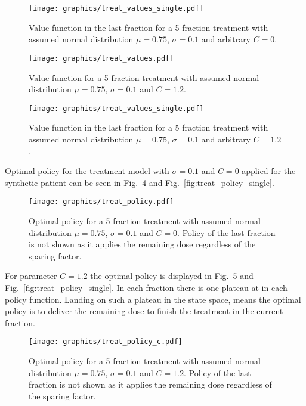 \documentclass[\relativeRoot/ada.tex]{subfiles}
\begin{document}
\begin{figure}[!htb]
    \centering
    \texttt{[image: graphics/treat\_values\_single.pdf]}
    \caption{Value function in the last fraction for a 5 fraction treatment with assumed normal distribution $\mu=0.75$, $\sigma=0.1$ and arbitrary $C=0$.}
    \label{fig:treat_values_single}
\end{figure}

\begin{figure}[!htb]
    \centering
    \texttt{[image: graphics/treat\_values.pdf]}
    \caption{Value function for a 5 fraction treatment with assumed normal distribution $\mu=0.75$, $\sigma=0.1$ and $C=1.2$.}
    \label{fig:treat_values_c}
\end{figure}

\begin{figure}[!htb]
    \centering
    \texttt{[image: graphics/treat\_values\_single.pdf]}
    \caption{Value function in the last fraction for a 5 fraction treatment with assumed normal distribution $\mu=0.75$, $\sigma=0.1$ and arbitrary $C=1.2$.}
    \label{fig:treat_values_single_c}
\end{figure}

Optimal policy for the treatment model with $\sigma=0.1$ and $C=0$ applied for the synthetic patient can be seen in Fig.~\ref{fig:treat_policy} and Fig.~\ref{fig:treat_policy_single}.

\begin{figure}[!htb]
    \centering
    \texttt{[image: graphics/treat\_policy.pdf]}
    \caption{Optimal policy for a 5 fraction treatment with assumed normal distribution $\mu=0.75$, $\sigma=0.1$ and $C=0$. Policy of the last fraction is not shown as it applies the remaining dose regardless of the sparing factor.}
    \label{fig:treat_policy}
\end{figure}

For parameter $C=1.2$ the optimal policy is displayed in Fig.~\ref{fig:treat_policy_c} and Fig.~\ref{fig:treat_policy_single}. In each fraction there is one plateau at in each policy function. Landing on such a plateau in the state space, means the optimal policy is to deliver the remaining dose to finish the treatment in the current fraction.

\begin{figure}[!htb]
    \centering
    \texttt{[image: graphics/treat\_policy\_c.pdf]}
    \caption{Optimal policy for a 5 fraction treatment with assumed normal distribution $\mu=0.75$, $\sigma=0.1$ and $C=1.2$. Policy of the last fraction is not shown as it applies the remaining dose regardless of the sparing factor.}
    \label{fig:treat_policy_c}
\end{figure}
\end{document}

